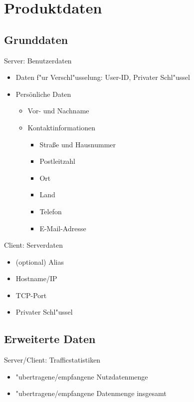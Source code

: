 \documentclass[a4paper,10pt]{scrartcl}
\begin{document}
\section{Produktdaten}

\subsection{Grunddaten}
\begin{usecase}
 {Server: Benutzerdaten
   \begin{itemize}
   \item Daten f"ur Verschl"usselung: User-ID, Privater Schl"ussel
   \item Persönliche Daten
      \begin{itemize}
      \item Vor- und Nachname
      \item Kontaktinformationen
         \begin{itemize}
         \item Straße und Hausnummer
         \item Postleitzahl
         \item Ort
         \item Land
         \item Telefon
         \item E-Mail-Adresse
         \end{itemize}
      \end{itemize}
   \end{itemize}
}
 {Client: Serverdaten
   \begin{itemize}
   \item (optional) Alias
   \item Hostname/IP
   \item TCP-Port
   \item Privater Schl"ussel
   \end{itemize}
}
\end{usecase}

\subsection{Erweiterte Daten}
\begin{usecase}
 {Server/Client: Trafficstatistiken
   \begin{itemize}
   \item "ubertragene/empfangene Nutzdatenmenge
   \item "ubertragene/empfangene Datenmenge insgesamt
   \end{itemize}
}
\end{usecase}
\end{document}

